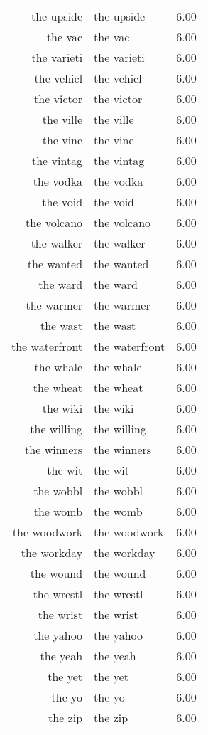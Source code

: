 \begin{table}[ht]
\begin{tabular}{rlr}
  the upside & the upside & 6.00 \\ 
  the vac & the vac & 6.00 \\ 
  the varieti & the varieti & 6.00 \\ 
  the vehicl & the vehicl & 6.00 \\ 
  the victor & the victor & 6.00 \\ 
  the ville & the ville & 6.00 \\ 
  the vine & the vine & 6.00 \\ 
  the vintag & the vintag & 6.00 \\ 
  the vodka & the vodka & 6.00 \\ 
  the void & the void & 6.00 \\ 
  the volcano & the volcano & 6.00 \\ 
  the walker & the walker & 6.00 \\ 
  the wanted & the wanted & 6.00 \\ 
  the ward & the ward & 6.00 \\ 
  the warmer & the warmer & 6.00 \\ 
  the wast & the wast & 6.00 \\ 
  the waterfront & the waterfront & 6.00 \\ 
  the whale & the whale & 6.00 \\ 
  the wheat & the wheat & 6.00 \\ 
  the wiki & the wiki & 6.00 \\ 
  the willing & the willing & 6.00 \\ 
  the winners & the winners & 6.00 \\ 
  the wit & the wit & 6.00 \\ 
  the wobbl & the wobbl & 6.00 \\ 
  the womb & the womb & 6.00 \\ 
  the woodwork & the woodwork & 6.00 \\ 
  the workday & the workday & 6.00 \\ 
  the wound & the wound & 6.00 \\ 
  the wrestl & the wrestl & 6.00 \\ 
  the wrist & the wrist & 6.00 \\ 
  the yahoo & the yahoo & 6.00 \\ 
  the yeah & the yeah & 6.00 \\ 
  the yet & the yet & 6.00 \\ 
  the yo & the yo & 6.00 \\ 
  the zip & the zip & 6.00 \\ 

\end{tabular}
\end{table}

